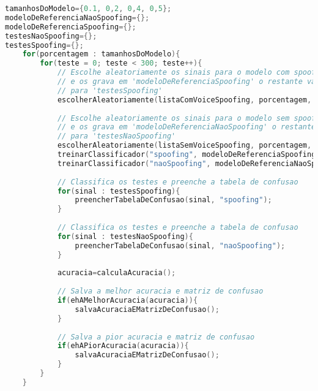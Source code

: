 \begin{lstlisting}[language=C++, caption={Algoritmo que caracteriza o procedimento 03}, label={lst:experiment03Algo}]
tamanhosDoModelo={0.1, 0,2, 0,4, 0,5};
modeloDeReferenciaNaoSpoofing={};
modeloDeReferenciaSpoofing={};
testesNaoSpoofing={};
testesSpoofing={};
	for(porcentagem : tamanhosDoModelo){
		for(teste = 0; teste < 300; teste++){
			// Escolhe aleatoriamente os sinais para o modelo com spoofing 
			// e os grava em 'modeloDeReferenciaSpoofing' o restante vai 
			// para 'testesSpoofing'
			escolherAleatoriamente(listaComVoiceSpoofing, porcentagem, modeloDeReferenciaSpoofing, testesSpoofing);
			
			// Escolhe aleatoriamente os sinais para o modelo sem spoofing
			// e os grava em 'modeloDeReferenciaNaoSpoofing' o restante vai 
			// para 'testesNaoSpoofing'
			escolherAleatoriamente(listaSemVoiceSpoofing, porcentagem, modeloDeReferenciaNaoSpoofing, testesNaoSpoofing);
			treinarClassificador("spoofing", modeloDeReferenciaSpoofing);
			treinarClassificador("naoSpoofing", modeloDeReferenciaNaoSpoofing);
			
			// Classifica os testes e preenche a tabela de confusao
			for(sinal : testesSpoofing){
				preencherTabelaDeConfusao(sinal, "spoofing");
			} 
			
			// Classifica os testes e preenche a tabela de confusao
			for(sinal : testesNaoSpoofing){
				preencherTabelaDeConfusao(sinal, "naoSpoofing");
			}
			
			acuracia=calculaAcuracia();
			
			// Salva a melhor acuracia e matriz de confusao
			if(ehAMelhorAcuracia(acuracia)){
				salvaAcuraciaEMatrizDeConfusao();
			}
			
			// Salva a pior acuracia e matriz de confusao
			if(ehAPiorAcuracia(acuracia)){
				salvaAcuraciaEMatrizDeConfusao();
			}
		}
	}			
\end{lstlisting}